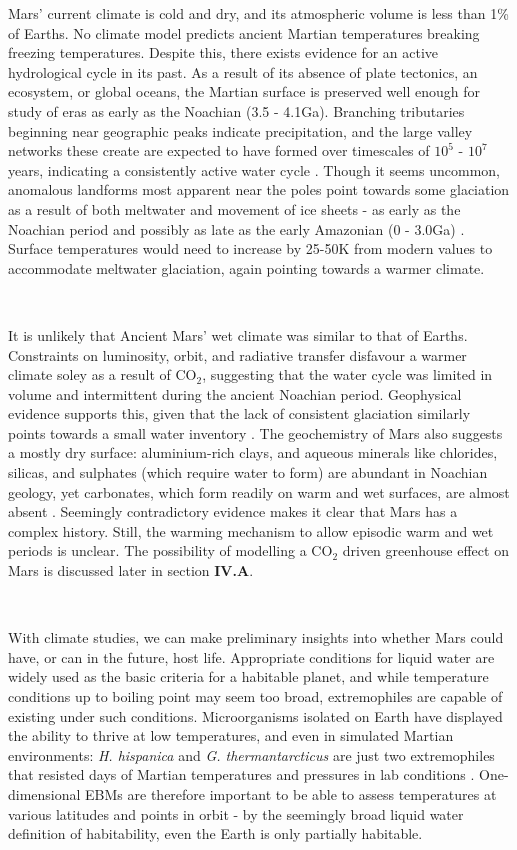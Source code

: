 \documentclass[12pt,onecolumn]{revtex4-2}    %
\begin{document}
Mars' current climate is cold and dry, and its atmospheric volume is less than 1\% of Earths. No climate model predicts ancient Martian temperatures breaking freezing temperatures. Despite this, there exists evidence for an active hydrological cycle in its past. As a result of its absence of plate tectonics, an ecosystem, or global oceans, the Martian surface is preserved well enough for study of eras as early as the Noachian (3.5 - 4.1Ga). Branching tributaries beginning near geographic peaks indicate precipitation, and the large valley networks these create are expected to have formed over timescales of $10^{5}$ - $10^{7}$ years, indicating a consistently active water cycle \cite{W16}. Though it seems uncommon, anomalous landforms most apparent near the poles point towards some glaciation as a result of both meltwater and movement of ice sheets - as early as the Noachian period and possibly as late as the early Amazonian (0 - 3.0Ga) \cite{KS92}. Surface temperatures would need to increase by 25-50K from modern values to accommodate meltwater glaciation, again pointing towards a warmer climate. %

\

It is unlikely that Ancient Mars' wet climate was similar to that of Earths. Constraints on luminosity, orbit, and radiative transfer disfavour a warmer climate soley as a result of $\mathrm{CO_2}$, suggesting that the water cycle was limited in volume and intermittent during the ancient Noachian period. Geophysical evidence supports this, given that the lack of consistent glaciation similarly points towards a small water inventory \cite{JJ14}. %
The geochemistry of Mars also suggests a mostly dry surface: aluminium-rich clays, and aqueous minerals like chlorides, silicas, and sulphates (which require water to form) are abundant in Noachian geology, yet carbonates, which form readily on warm and wet surfaces, are almost absent \cite{C13} \cite{EE14}. Seemingly contradictory evidence makes it clear that Mars has a complex history. Still, the warming mechanism to allow episodic warm and wet periods is unclear. The possibility of modelling a $\mathrm{CO_2}$ driven greenhouse effect on Mars is discussed later in section \textbf{IV.A}.

\

With climate studies, we can make preliminary insights into whether Mars could have, or can in the future, host life. %
Appropriate conditions for liquid water are widely used as the basic criteria for a habitable planet, and while temperature conditions up to boiling point may seem too broad, extremophiles are capable of existing under such conditions. Microorganisms isolated on Earth have displayed the ability to thrive at low temperatures, and even in simulated Martian environments: \textit{H. hispanica} and \textit{G. thermantarcticus} are just two extremophiles that resisted days of Martian temperatures and pressures in lab conditions \cite{M14}. One-dimensional EBMs are therefore important to be able to assess temperatures at various latitudes and points in orbit - by the seemingly broad liquid water definition of habitability, even the Earth is only partially habitable.
\end{document}
